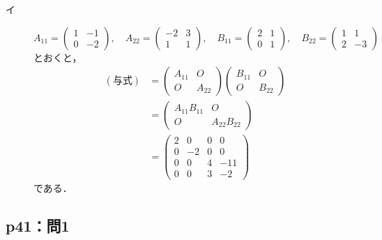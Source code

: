 \documentclass[uplatex,dvipdfmx,a4paper,11pt,fleqn]{jsarticle}
\begin{document}
\begin{tleftbar}
    \begin{description}
        \item[イ] 
        \[
            A_{11} = \begin{pmatrix} 1 & -1 \\ 0 & -2 \end{pmatrix},\quad A_{22} = \begin{pmatrix} -2 & 3 \\ 1 & 1 \end{pmatrix} ,\quad B_{11} = \begin{pmatrix} 2 & 1 \\ 0 & 1\end{pmatrix} ,\quad B_{22}= \begin{pmatrix} 1 & 1 \\ 2 & -3 \end{pmatrix}
        \]
        とおくと，
        \begin{align*} 
            (\text{与式})&= \begin{pmatrix} A_{11} & O \\ O & A_{22} \end{pmatrix} \begin{pmatrix} B_{11} & O \\ O & B_{22} \end{pmatrix} \\
            & = \begin{pmatrix} A_{11} B_{11} & O \\ O & A_{22} B_{22} \end{pmatrix} \\
            & = \begin{pmatrix} 2 & 0 & 0 & 0 \\ 0 & -2 & 0 & 0 \\ 0 & 0 & 4 & -11 \\ 0 & 0 & 3 & -2 \end{pmatrix}
        \end{align*}
        である．
    \end{description}
\end{tleftbar}

\subsection*{p41：問1}
%
\end{document}
